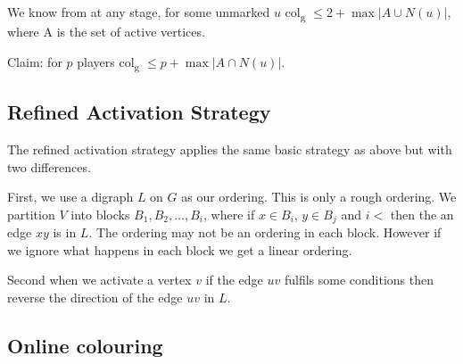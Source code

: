 We know from \cite{Zhu2008} at any stage, for some unmarked $u$ col\textsubscript{g} $\leq 2 + \max{\left| A \cup N(u)\right| }$, where A is the set of active vertices.

Claim: for $p$ players col\textsubscript{g} $\leq p + \max{ \left| A \cap N(u)\right| }$. 

\subsection{Refined Activation Strategy}
The refined activation strategy applies the same basic strategy as above but with two differences. 

First, we use a digraph $L$ on $G$ as our ordering. This is only a rough ordering. We partition $V$ into blocks $B_1,B_2,\dots,B_i$, where if $x \in B_i$, $y \in B_j$ and $i <$ then the an edge $xy$ is in $L$. The ordering may not be an ordering in each block. However if we ignore what happens in each block we get a linear ordering.

Second when we activate a vertex $v$ if the edge $uv$ fulfils some conditions then reverse the direction of the edge $uv$ in $L$.

\subsection{Online colouring}

        


















